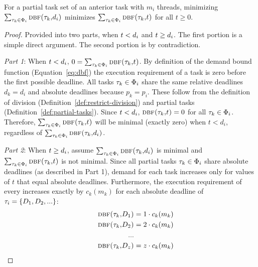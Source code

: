 \documentclass[a4paper,UKenglish,cleveref,autoref,english]{lipics-v2019}
\begin{document}
\begin{theorem}
  \label{thm:all-demand}
  For a partial task set  of an anterior task  with
  ${m_i}$ threads, minimizing ${\sum_{\tau_{k} \in \Phi_i}
    \text{\sc{dbf}(\ensuremath{\tau_{k}},\ensuremath{d_{i}})}}$ minimizes ${\sum_{\tau_{k} \in
      \Phi_i} \text{\sc{dbf}(\ensuremath{\tau_{k}},${t}$)}}$ for all ${t \ge 0}$.
\begin{proof}
  Provided into two parts, when ${t < d_{i}}$ and
  ${t \ge d_{i}}$. The first portion is a simple direct
  argument. The second portion is by contradiction.

  \emph{Part 1}: When ${t < d_{i}}$,
  ${0 = \sum_{\tau_{k} \in \Phi_i}\text{\sc{dbf}(\ensuremath{\tau_{k}},$t$)}}$. By definition
  of the demand bound function (Equation~\ref{eq:dbf}) the execution
  requirement of a task is zero before the first possible
  deadline. All tasks ${\tau_{k} \in \Phi_{i}}$ share the same
  relative deadlines ${d_k = d_i}$ and absolute deadlines because
  ${p_k = p_i}$. These follow from the definition of
  division (Definition~\ref{def:restrict-division}) and partial tasks
  (Definition~\ref{def:partial-tasks}). Since ${t < d_{i}}$, ${\text{\sc{dbf}(\ensuremath{\tau_{k}},$t$)} = 0}$ for all ${\tau_{k} \in
    \Phi_{i}}$. Therefore, ${\sum_{\tau_{k} \in \Phi_i}
    \text{\sc{dbf}(\ensuremath{\tau_{k}},${t}$)}}$ will be minimal (exactly zero) when ${t <
    d_i}$, regardless of ${\sum_{\tau_{k} \in \Phi_i}
    \text{\sc{dbf}(\ensuremath{\tau_{k}},\ensuremath{d_{i}})}}$.

  \emph{Part 2}: When ${t \ge d_{i}}$, assume
  ${\sum_{\tau_{k} \in \Phi_{i}} \text{\sc{dbf}(\ensuremath{\tau_{k}},\ensuremath{d_{i}})}}$ is 
  minimal and ${\sum_{\tau_{k} \in \Phi_{i}} \text{\sc{dbf}(\ensuremath{\tau_{k}},${t}$)}}$ is
  not minimal. Since all partial tasks ${\tau_{k} \in \Phi_{i}}$ share
  absolute deadlines (as described in Part 1), demand for each task
   increases only for values of ${t}$ that equal
  absolute deadlines. Furthermore, the execution requirement of
  every  increases exactly by ${c_k(m_k)}$ for each absolute
  deadline of ${\tau_{i} = \{ D_{1}, D_{2}, ... \}}$: %
  \begin{equation*}
    \indent
    \begin{split}
      \dbf{\task{k}}{\Deadline{1}} &= 1 \cdot c_k(m_k) \\
      \dbf{\task{k}}{\Deadline{2}} &= 2 \cdot c_k(m_k) \\
      ... \\
      \dbf{\task{k}}{\Deadline{z}} &= z \cdot c_k(m_k)
    \end{split}
  \end{equation*}


\end{proof}
\end{theorem}
\end{document}
